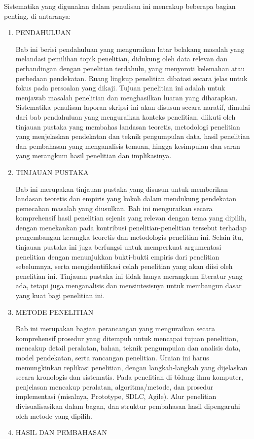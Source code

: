 Sistematika yang digunakan dalam penulisan ini mencakup beberapa bagian
penting, di antaranya:
\begin{enumerate}
\item PENDAHULUAN

Bab ini berisi pendahuluan yang menguraikan latar belakang masalah
yang melandasi pemilihan topik penelitian, didukung oleh data relevan
dan perbandingan dengan penelitian terdahulu, yang menyoroti kelemahan
atau perbedaan pendekatan. Ruang lingkup penelitian dibatasi secara
jelas untuk fokus pada persoalan yang dikaji. Tujuan penelitian ini
adalah untuk menjawab masalah penelitian dan menghasilkan luaran yang
diharapkan. Sistematika penulisan laporan skripsi ini akan disusun
secara naratif, dimulai dari bab pendahuluan yang menguraikan konteks
penelitian, diikuti oleh tinjauan pustaka yang membahas landasan teoretis,
metodologi penelitian yang menjelaskan pendekatan dan teknik pengumpulan
data, hasil penelitian dan pembahasan yang menganalisis temuan, hingga
kesimpulan dan saran yang merangkum hasil penelitian dan implikasinya.
\item TINJAUAN PUSTAKA

Bab ini merupakan tinjauan pustaka yang disusun untuk memberikan landasan
teoretis dan empiris yang kokoh dalam mendukung pendekatan pemecahan
masalah yang diusulkan. Bab ini menguraikan secara komprehensif hasil
penelitian sejenis yang relevan dengan tema yang dipilih, dengan menekankan
pada kontribusi penelitian-penelitian tersebut terhadap pengembangan
kerangka teoretis dan metodologis penelitian ini. Selain itu, tinjauan
pustaka ini juga berfungsi untuk memperkuat argumentasi penelitian
dengan menunjukkan bukti-bukti empiris dari penelitian sebelumnya,
serta mengidentifikasi celah penelitian yang akan diisi oleh penelitian
ini. Tinjauan pustaka ini tidak hanya merangkum literatur yang ada,
tetapi juga menganalisis dan mensintesisnya untuk membangun dasar
yang kuat bagi penelitian ini.
\item METODE PENELITIAN

Bab ini merupakan bagian perancangan yang menguraikan secara komprehensif
prosedur yang ditempuh untuk mencapai tujuan penelitian, mencakup
detail peralatan, bahan, teknik pengumpulan dan analisis data, model
pendekatan, serta rancangan penelitian. Uraian ini harus memungkinkan
replikasi penelitian, dengan langkah-langkah yang dijelaskan secara
kronologis dan sistematis. Pada penelitian di bidang ilmu komputer,
penjelasan mencakup peralatan, algoritma/metode, dan prosedur implementasi
(misalnya, Prototype, SDLC, Agile). Alur penelitian divisualisasikan
dalam bagan, dan struktur pembahasan hasil dipengaruhi oleh metode
yang dipilih.
\item HASIL DAN PEMBAHASAN


\end{enumerate}
